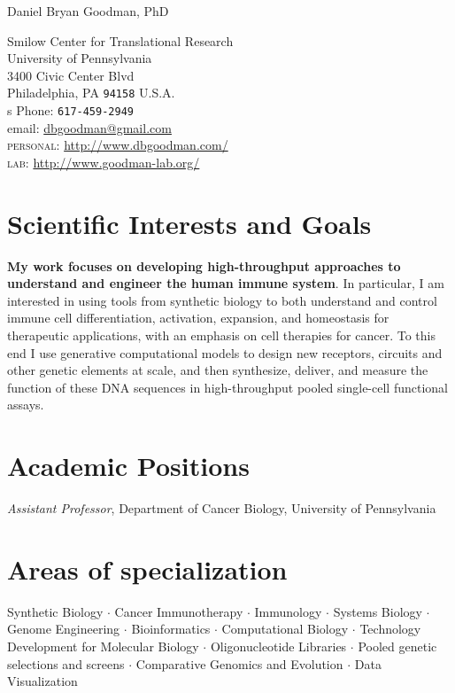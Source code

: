 \documentclass[11pt, letterpaper]{article}
\newcommand{\years}[1]{\marginnote{\scriptsize #1}}
\newcommand{\cd}{$\cdot${ }}
\begin{document}
\textsf{\huge Daniel Bryan Goodman, PhD}\\[0cm]
\begin{multicols}{2}
Smilow Center for Translational Research \\
University of Pennsylvania \\
3400 Civic Center Blvd\\
Philadelphia, PA \texttt{94158}
U.S.A.\\[0cm]

\columnbreak
s
Phone: \texttt{617-459-2949}\\
email: \href{mailto:dbgoodman@gmail.com}{dbgoodman@gmail.com}\\
\textsc{personal}: \href{http://www.dbgoodman.com/}{http://www.dbgoodman.com/}\\
\textsc{lab}: \href{http://www.goodman-lab.org/}{http://www.goodman-lab.org/}\\
\end{multicols}

\section*{Scientific Interests and Goals}

\textbf{My work focuses on developing high-throughput approaches to understand and engineer the human immune system}. In particular, I am interested in using tools from synthetic biology to both understand and control immune cell differentiation, activation, expansion, and homeostasis for therapeutic applications, with an emphasis on cell therapies for cancer. To this end I use generative computational models to design new receptors, circuits and other genetic elements at scale, and then synthesize, deliver, and measure the function of these DNA sequences in high-throughput pooled single-cell functional assays.

\section*{Academic Positions}
\years{2025-present} \emph{Assistant Professor}, Department of Cancer Biology, University of Pennsylvania
\vspace{0.2em} %

\section*{Areas of specialization}
\nohyphens{
Synthetic Biology \cd Cancer Immunotherapy \cd Immunology  \cd Systems Biology \cd Genome Engineering \cd Bioinformatics \cd Computational Biology \cd Technology Development for Molecular Biology \cd Oligonucleotide Libraries \cd Pooled genetic selections and screens \cd Comparative Genomics and Evolution \cd Data Visualization }
\end{document}
